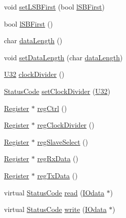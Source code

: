 \begin{DoxyCompactItemize}
\item 
void \hyperlink{classUsbSpiBus_ab601d59e0b5110c2275c1cc298664e27}{set\+L\+S\+B\+First} (bool \hyperlink{classUsbSpiBus_af6af49c1ac52cc0586570c1f43d0bc25}{l\+S\+B\+First})
\item 
bool \hyperlink{classUsbSpiBus_af6af49c1ac52cc0586570c1f43d0bc25}{l\+S\+B\+First} ()
\item 
char \hyperlink{classUsbSpiBus_ae7d38b275b5267f795b2d9f1d561d688}{data\+Length} ()
\item 
void \hyperlink{classUsbSpiBus_abb9644f0110078dc08c84c907d11272e}{set\+Data\+Length} (char \hyperlink{classUsbSpiBus_ae7d38b275b5267f795b2d9f1d561d688}{data\+Length})
\item 
\hyperlink{classUsbSpiBus_a9b24e28662a35ca57f5ed32c41c5f3ff}{U32} \hyperlink{classUsbSpiBus_aa7a56b8aedb646ba46408cb5016dde1c}{clock\+Divider} ()
\item 
\hyperlink{classStatusCode}{Status\+Code} \hyperlink{classUsbSpiBus_a8cd3c808e7b72d8bc0f1d85a774e8c99}{set\+Clock\+Divider} (\hyperlink{classUsbSpiBus_a9b24e28662a35ca57f5ed32c41c5f3ff}{U32})
\item 
\hyperlink{classRegister}{Register} $\ast$ \hyperlink{classUsbSpiBus_a22900de7a32af6916f74584f2172424a}{reg\+Ctrl} ()
\item 
\hyperlink{classRegister}{Register} $\ast$ \hyperlink{classUsbSpiBus_a338edc7bdac1abd1998890bb1aa0509a}{reg\+Clock\+Divider} ()
\item 
\hyperlink{classRegister}{Register} $\ast$ \hyperlink{classUsbSpiBus_a9bc70ad9842d8aa8f89b24599bfd6238}{reg\+Slave\+Select} ()
\item 
\hyperlink{classRegister}{Register} $\ast$ \hyperlink{classUsbSpiBus_adb0c94f37c7e6008ed4540efa94559b3}{reg\+Rx\+Data} ()
\item 
\hyperlink{classRegister}{Register} $\ast$ \hyperlink{classUsbSpiBus_ab8044b2af7209f9eb37c0a96e3e28637}{reg\+Tx\+Data} ()
\item 
virtual \hyperlink{classStatusCode}{Status\+Code} \hyperlink{classUsbSpiBus_a6c08e2e9a50e4c540c1eda6d7d2967a5}{read} (\hyperlink{classIOdata}{I\+Odata} $\ast$)
\item 
virtual \hyperlink{classStatusCode}{Status\+Code} \hyperlink{classUsbSpiBus_a3ac9d6f5053ddb8b2f8336f2aa88934e}{write} (\hyperlink{classIOdata}{I\+Odata} $\ast$)
\end{DoxyCompactItemize}
